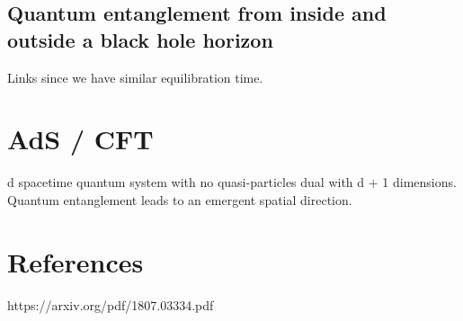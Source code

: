 \documentclass[11pt, oneside]{article}   	%
\theoremstyle{slanted}
\begin{document}
\subsection{Quantum entanglement from inside and outside a black hole horizon}
Links since we have similar equilibration time. 

\section{AdS / CFT} 
d spacetime quantum system with no quasi-particles dual
with d + 1 dimensions. 
Quantum entanglement leads to an emergent spatial direction. 

\section{References} 
https://arxiv.org/pdf/1807.03334.pdf
\end{document}
